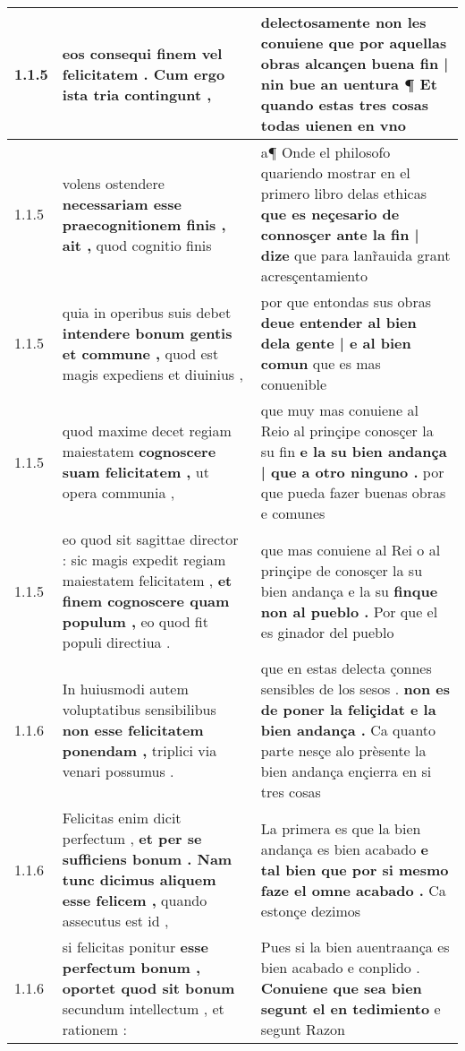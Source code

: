 \begin{tabular}{|p{1cm}|p{6.5cm}|p{6.5cm}|}
1.1.5 & eos \textbf{ consequi finem vel felicitatem . } Cum ergo ista tria contingunt , & delectosamente non les conuiene \textbf{ que por aquellas obras alcançen buena fin | nin bue an uentura ¶ } Et quando estas tres cosas todas uienen en vno \\\hline
1.1.5 & volens ostendere \textbf{ necessariam esse praecognitionem finis , ait , } quod cognitio finis & a¶ Onde el philosofo quariendo mostrar en el primero libro delas ethicas \textbf{ que es neçesario de connosçer ante la fin | dize } que para lanr̃auida grant acresçentamiento \\\hline
1.1.5 & quia in operibus suis debet \textbf{ intendere bonum gentis et commune , } quod est magis expediens et diuinius , & por que entondas sus obras \textbf{ deue entender al bien dela gente | e al bien comun } que es mas conuenible \\\hline
1.1.5 & quod maxime decet regiam maiestatem \textbf{ cognoscere suam felicitatem , } ut opera communia , & que muy mas conuiene al Reio al prinçipe conosçer la su fin \textbf{ e la su bien andança | que a otro ninguno . } por que pueda fazer buenas obras e comunes \\\hline
1.1.5 & eo quod sit sagittae director : sic magis expedit regiam maiestatem felicitatem , \textbf{ et finem cognoscere quam populum , } eo quod fit populi directiua . & que mas conuiene al Rei o al prinçipe de conosçer la su bien andança e la su \textbf{ finque non al pueblo . } Por que el es ginador del pueblo \\\hline
1.1.6 & In huiusmodi autem voluptatibus sensibilibus \textbf{ non esse felicitatem ponendam , } triplici via venari possumus . & que en estas delecta çonnes sensibles de los sesos . \textbf{ non es de poner la feliçidat e la bien andança . } Ca quanto parte nesçe alo prèsente la bien andança ençierra en si tres cosas \\\hline
1.1.6 & Felicitas enim dicit perfectum , \textbf{ et per se sufficiens bonum . Nam tunc dicimus aliquem esse felicem , } quando assecutus est id , & La primera es que la bien andança es bien acabado \textbf{ e tal bien que por si mesmo faze el omne acabado . } Ca estonçe dezimos \\\hline
1.1.6 & si felicitas ponitur \textbf{ esse perfectum bonum , oportet quod sit bonum } secundum intellectum , et rationem : & Pues si la bien auentraança es bien acabado e conplido . \textbf{ Conuiene que sea bien segunt el en tedimiento } e segunt Razon \\\hline

\end{tabular}
